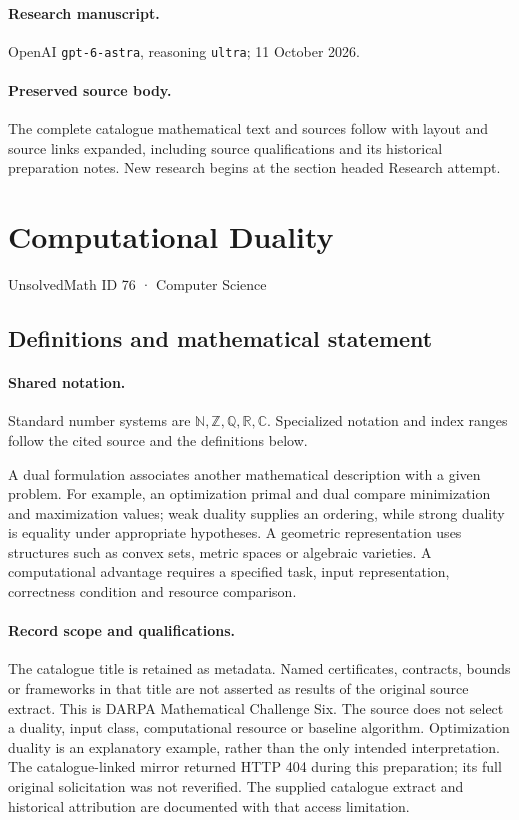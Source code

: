 \documentclass[11pt]{article}
\begin{document}
\paragraph{Research manuscript.} OpenAI \texttt{gpt-6-astra}, reasoning \texttt{ultra}; 11 October 2026.
\paragraph{Preserved source body.} The complete catalogue mathematical text and sources follow with layout and source links expanded, including source qualifications and its historical preparation notes. New research begins at the section headed Research attempt.

\section{Computational Duality}\label{76}
{\small UnsolvedMath ID 76 · Computer Science}
\subsection{Definitions and mathematical statement}

\paragraph{Shared notation.}Standard number systems are $\mathbb N,\mathbb Z,\mathbb Q,\mathbb R,\mathbb C$. Specialized notation and index ranges follow the cited source and the definitions below.


A dual formulation associates another mathematical description with a given problem. For example, an optimization primal and dual compare minimization and maximization values; weak duality supplies an ordering, while strong duality is equality under appropriate hypotheses. A geometric representation uses structures such as convex sets, metric spaces or algebraic varieties. A computational advantage requires a specified task, input representation, correctness condition and resource comparison.
\paragraph{Record scope and qualifications.}
The catalogue title is retained as metadata. Named certificates, contracts, bounds or frameworks in that title are not asserted as results of the original source extract.
This is DARPA Mathematical Challenge Six. The source does not select a duality, input class, computational resource or baseline algorithm. Optimization duality is an explanatory example, rather than the only intended interpretation. The catalogue-linked mirror returned HTTP 404 during this preparation; its full original solicitation was not reverified. The supplied catalogue extract and historical attribution are documented with that access limitation.
\end{document}
